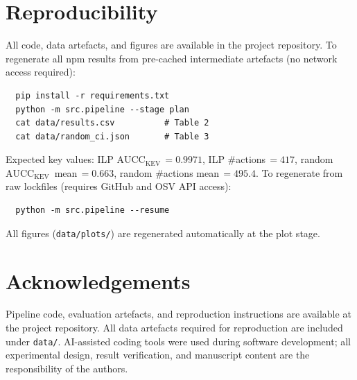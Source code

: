 \documentclass[conference]{IEEEtran}
\newcommand{\aucc}{$\mathrm{AUCC}_{\mathrm{KEV}}$\xspace}
\begin{document}
\section*{Reproducibility}
\label{sec:repro}

All code, data artefacts, and figures are available in the project
repository.  To regenerate all npm results from pre-cached intermediate
artefacts (no network access required):
\begin{verbatim}
  pip install -r requirements.txt
  python -m src.pipeline --stage plan
  cat data/results.csv          # Table 2
  cat data/random_ci.json       # Table 3
\end{verbatim}
Expected key values: ILP \aucc\,$=0.9971$, ILP \#actions\,$=417$,
random \aucc\ mean\,$=0.663$, random \#actions mean\,$=495.4$.
To regenerate from raw lockfiles (requires GitHub and OSV API access):
\begin{verbatim}
  python -m src.pipeline --resume
\end{verbatim}
All figures (\texttt{data/plots/}) are regenerated automatically
at the plot stage.

\section*{Acknowledgements}
Pipeline code, evaluation artefacts, and reproduction instructions are
available at the project repository.  All data artefacts required for
reproduction are included under \texttt{data/}.
AI-assisted coding tools were used during software development;
all experimental design, result verification, and manuscript
content are the responsibility of the authors.
\end{document}
